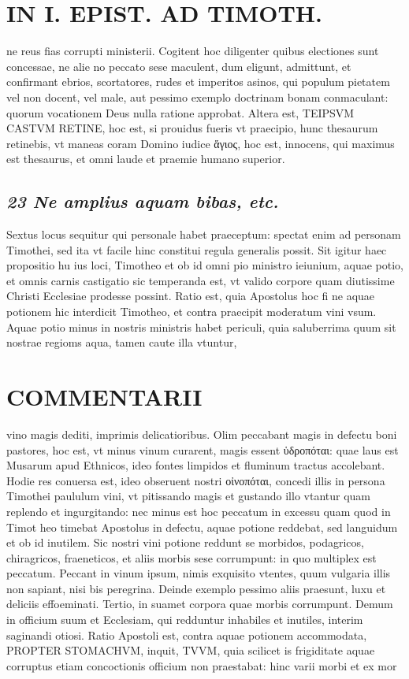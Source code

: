 \documentclass{article}
\begin{document}
\begin{pages}
\section*{IN I. EPIST. AD TIMOTH. }
\marginpar{[ p.139 ]}\pstart ne reus fias corrupti ministerii. Cogitent hoc diligenter quibus electiones sunt concessae, ne alie no peccato sese maculent, dum eligunt, admittunt, et confirmant ebrios, scortatores, rudes et imperitos asinos, qui populum pietatem vel non docent, vel male, aut pessimo exemplo doctrinam bonam conmaculant: quorum vocationem Deus nulla ratione approbat.  \pend\pstart Altera est, TEIPSVM CASTVM RETINE, hoc est, si prouidus fueris vt praecipio, hunc thesaurum retinebis, vt maneas coram Domino iudice ἅγιος, hoc est, innocens, qui maximus est thesaurus, et omni laude et praemie humano superior.  \pend
{}
{}
\subsection*{\textit{23 Ne amplius aquam bibas, etc. }}\pstart Sextus locus sequitur qui personale habet praeceptum: spectat enim ad personam Timothei, sed ita vt facile hinc constitui regula generalis possit. Sit igitur haec propositio hu ius loci, Timotheo et ob id omni pio ministro ieiunium, aquae potio, et omnis carnis castigatio sic temperanda est, vt valido corpore quam diutissime Christi Ecclesiae prodesse possint. Ratio est, quia Apostolus hoc fi ne aquae potionem hic interdicit Timotheo, et contra praecipit moderatum vini vsum. Aquae potio minus in nostris ministris habet periculi, quia saluberrima quum sit nostrae regioms aqua, tamen caute illa vtuntur,  \pend
\section*{COMMENTARII }
\marginpar{[ p.140 ]}\pstart vino magis dediti, imprimis delicatioribus. Olim peccabant magis in defectu boni pastores, hoc est, vt minus vinum curarent, magis essent ὑδροπόται: quae laus est Musarum apud Ethnicos, ideo fontes limpidos et fluminum tractus accolebant. Hodie res conuersa est, ideo obseruent nostri οἰνοπόται, concedi illis in persona Timothei paululum vini, vt pitissando magis et gustando illo vtantur quam replendo et ingurgitando: nec minus est hoc peccatum in excessu quam quod in Timot heo timebat Apostolus in defectu, aquae potione reddebat, sed languidum et ob id inutilem. Sic nostri vini potione reddunt se morbidos, podagricos, chiragricos, fraeneticos, et aliis morbis sese corrumpunt: in quo multiplex est peccatum. Peccant in vinum ipsum, nimis exquisito vtentes, quum vulgaria illis non sapiant, nisi bis peregrina. Deinde exemplo pessimo aliis praesunt, luxu et deliciis effoeminati. Tertio, in suamet corpora quae morbis corrumpunt. Demum in officium suum et Ecclesiam, qui redduntur inhabiles et inutiles, interim saginandi otiosi.  \pend\pstart Ratio Apostoli est, contra aquae potionem accommodata, PROPTER STOMACHVM, inquit, TVVM, quia scilicet is frigiditate aquae corruptus etiam concoctionis officium non praestabat: hinc varii morbi et ex mor\pend

\end{pages}
\end{document}
